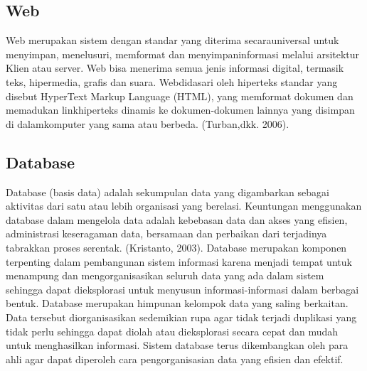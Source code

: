 \documentclass{jtetiproposalskripsi}
\begin{document}
\subsection{Web}

Web merupakan sistem dengan standar yang diterima secarauniversal untuk menyimpan, menelusuri, memformat dan menyimpaninformasi melalui arsitektur Klien atau server. Web bisa menerima semua jenis informasi digital, termasik teks, hipermedia, grafis dan suara. Webdidasari oleh hiperteks standar yang disebut  HyperText Markup Language (HTML), yang memformat dokumen dan memadukan linkhiperteks dinamis ke dokumen-dokumen lainnya yang disimpan di dalamkomputer yang sama atau berbeda. (Turban,dkk. 2006). 

\subsection{Database}
Database (basis data) adalah sekumpulan data yang digambarkan sebagai aktivitas dari satu atau lebih organisasi yang  berelasi. Keuntungan menggunakan database dalam mengelola data adalah kebebasan data dan akses yang efisien, administrasi keseragaman data, bersamaan dan perbaikan dari terjadinya tabrakkan proses serentak. (Kristanto, 2003).
 Database merupakan komponen terpenting dalam  pembangunan sistem informasi karena menjadi tempat untuk menampung dan mengorganisasikan seluruh data yang ada dalam sistem sehingga dapat dieksplorasi untuk menyusun informasi-informasi dalam berbagai bentuk.
 Database merupakan himpunan kelompok data yang saling berkaitan. Data tersebut diorganisasikan sedemikian rupa agar tidak terjadi duplikasi yang tidak perlu sehingga dapat diolah atau dieksplorasi secara cepat dan mudah untuk menghasilkan informasi. Sistem database terus dikembangkan oleh para ahli agar dapat diperoleh cara pengorganisasian data yang efisien dan efektif.
 
\end{document}
